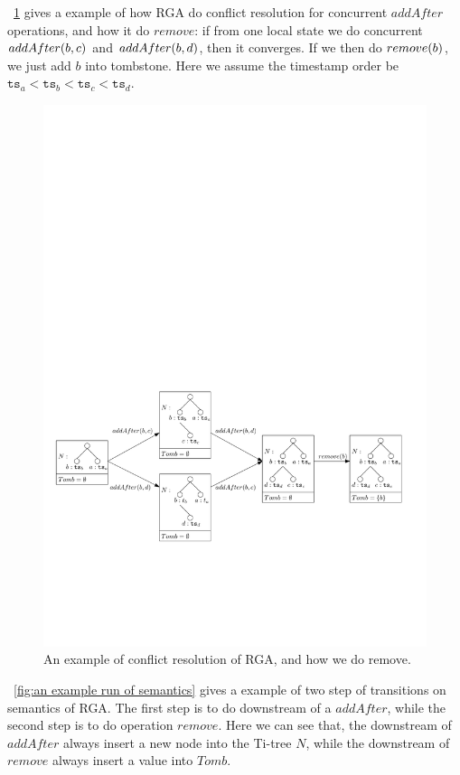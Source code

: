 \figurename~\ref{fig:how RGA works} gives a example of how RGA do conflict resolution for concurrent $addAfter$ operations, and how it do $remove$: if from one local state we do concurrent $\alabelshort[addAfter]{b,c}$ and $\alabelshort[addAfter]{b,d}$, then it converges. If we then do $\alabelshort[remove]{b}$, we just add $b$ into tombstone. Here we assume the timestamp order be $\ensuremath{\mathtt{ts}}_a < \ensuremath{\mathtt{ts}}_b < \ensuremath{\mathtt{ts}}_c < \ensuremath{\mathtt{ts}}_d$. 

\begin{figure}[t]
  \centering
  \includegraphics[width=0.85 \textwidth]{figures/HowRGAWork.pdf}
\vspace{-10pt}
  \caption{An example of conflict resolution of RGA, and how we do remove.}
  \label{fig:how RGA works}
\end{figure}


\figurename~\ref{fig:an example run of semantics} gives a example of two step of transitions on semantics of RGA. The first step is to do downstream of a $addAfter$, while the second step is to do operation $remove$. Here we can see that, the downstream of $addAfter$ always insert a new node into the Ti-tree $N$, while the downstream of $remove$ always insert a value into $Tomb$.

